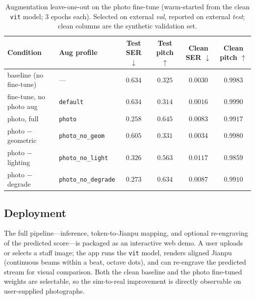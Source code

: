 \begin{table}[htbp]
\centering
\caption{Augmentation leave-one-out on the photo fine-tune (warm-started from the
clean \texttt{vit} model; $3$ epochs each). Selected on external \emph{val},
reported on external \emph{test}; clean columns are the synthetic validation set.}
\label{table:ablation}
\begin{tabular}{llcccc}
\toprule
\textbf{Condition} & \textbf{Aug profile} & \textbf{Test SER $\downarrow$} & \textbf{Test pitch $\uparrow$} & \textbf{Clean SER $\downarrow$} & \textbf{Clean pitch $\uparrow$} \\
\midrule
baseline (no fine-tune)   & ---                   & $0.634$          & $0.325$          & $0.0030$ & $0.9983$ \\
fine-tune, no photo aug   & \texttt{default}      & $0.634$          & $0.314$          & $0.0016$ & $0.9990$ \\
photo, full               & \texttt{photo}        & $\mathbf{0.258}$ & $\mathbf{0.645}$ & $0.0083$ & $0.9917$ \\
photo $-$ geometric       & \texttt{photo\_no\_geom}    & $0.605$    & $0.331$          & $0.0034$ & $0.9980$ \\
photo $-$ lighting        & \texttt{photo\_no\_light}   & $0.326$    & $0.563$          & $0.0117$ & $0.9859$ \\
photo $-$ degrade         & \texttt{photo\_no\_degrade} & $0.273$    & $0.634$          & $0.0087$ & $0.9910$ \\
\bottomrule
\end{tabular}
\end{table}

\subsection{Deployment}
\label{sec:exp:deploy}

The full pipeline---inference, token-to-Jianpu mapping, and optional re-engraving
of the predicted score---is packaged as an interactive web demo. A user uploads or
selects a staff image; the app runs the \texttt{vit} model, renders aligned Jianpu
(continuous beams within a beat, octave dots), and can re-engrave the predicted
stream for visual comparison. Both the clean baseline and the photo fine-tuned
weights are selectable, so the sim-to-real improvement is directly observable on
user-supplied photographs.
